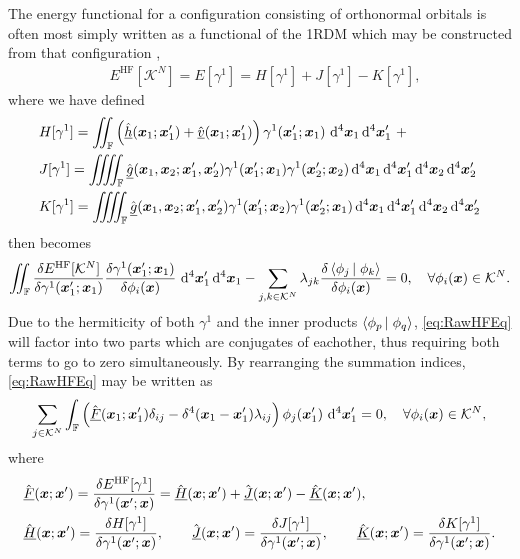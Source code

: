 The energy functional for a configuration consisting of orthonormal orbitals is often most simply 
written as a functional of the 1RDM which may be constructed from that configuration \cite{Yang89_book},
\begin{align}
&E^\mathrm{HF}[\mathcal{K}^N] = E[\gamma^1] = H[\gamma^1] + J[\gamma^1] - K[\gamma^1],
\end{align}
where we have defined
\begin{align}
  &H[\gamma^1] = 
    \iint_\mathbb{F} \left( \spop{h}(\vc{x}_1; \vc{x}_1') + \spop{v}(\vc{x}_1; \vc{x}_1')\right) \gamma^1(\vc{x}'_1; \vc{x}_1) \, \dd^4\vc{x}_1 \dd^4\vc{x}'_1\,\,+ 
    \\
  &J[\gamma^1] = \iiiint_\mathbb{F} \spop{g}(\vc{x}_1, \vc{x}_2; \vc{x}_1', \vc{x}_2') 
      \gamma^1(\vc{x}'_1; \vc{x}_1)\gamma^1(\vc{x}'_2; \vc{x}_2) 
    \dd^4\vc{x}_1 \dd^4\vc{x}'_1\dd^4\vc{x}_2 \dd^4\vc{x}'_2 \\
  &K[\gamma^1] = \iiiint_\mathbb{F} \spop{g}(\vc{x}_1, \vc{x}_2; \vc{x}_1', \vc{x}_2') 
      \gamma^1(\vc{x}'_1; \vc{x}_2)\gamma^1(\vc{x}'_2; \vc{x}_1) 
    \dd^4\vc{x}_1 \dd^4\vc{x}'_1\dd^4\vc{x}_2 \dd^4\vc{x}'_2 
\end{align}
 then becomes
\begin{equation}
    \label{eq:RawHFEq}
    \int\mkern-12mu\int_{\mathbb F}\frac{\delta E^\mathrm{HF}[\mathcal{K}^N]}{\delta \gamma^{1} (\boldsymbol{x}'_1; \boldsymbol{x}_1)} \frac{\delta \gamma^{1}(\boldsymbol{x}'_1; \boldsymbol{x}_1)}{\delta \phi_i(\boldsymbol{x})} \,\,\mathrm{d}^4\boldsymbol{x}'_1 \,\mathrm{d}^4 \boldsymbol{x}_1 - 
    \sum_{j,k \in \mathcal{K}^N} \lambda_{jk} \frac{\delta \left\langle \phi_j \left\vert\right. \phi_k \right\rangle}{\delta \phi_i(\boldsymbol{x})}  = 0 ,\quad \forall \phi_i(\boldsymbol{x}) \in \mathcal{K}^N.
\end{equation}
Due to the hermiticity of both $\gamma^1$ and the inner products $\left\langle \phi_p \left\vert\right. \phi_q \right\rangle$, \cref{eq:RawHFEq} will factor into two parts which are 
conjugates of eachother, thus requiring both terms to go to zero simultaneously. By rearranging the summation indices, \cref{eq:RawHFEq} may be written as
\begin{align}
  \label{eq:HFNonCan}
  \sum_{j \in \mathcal{K}^N}
  \int_{\mathbb F} \left( \hat{\underline{F}}(\boldsymbol{x}_1; \boldsymbol{x}_1')\delta_{ij}   - \delta^4(\boldsymbol{x} _1- \boldsymbol{x}_1')\lambda_{ij} \right)
    \phi_j(\boldsymbol{x}_1')\,\,\mathrm{d}^4\boldsymbol{x}_1' = 0 ,\quad \forall \phi_i(\boldsymbol{x}) \in \mathcal{K}^N,
\end{align}
where
\begin{align}
&\hat{\underline{F}}(\boldsymbol{x}; \boldsymbol{x}') = 
  \frac{\delta E^\mathrm{HF}[\gamma^1]}{\delta \gamma^{1}(\boldsymbol{x}'; \boldsymbol{x})} = \hat{\underline{H}}(\boldsymbol{x};\boldsymbol{x}') + \hat{\underline{J}}(\boldsymbol{x};\boldsymbol{x}') - \hat{\underline{K}}(\boldsymbol{x};\boldsymbol{x}'),\\
&\hat{\underline{H}}(\boldsymbol{x}; \boldsymbol{x}') = \frac{\delta H[\gamma^1]}{\delta \gamma^1(\boldsymbol{x}'; \boldsymbol{x})},\qquad 
\hat{\underline{J}}(\boldsymbol{x}; \boldsymbol{x}') = \frac{\delta J[\gamma^1]}{\delta \gamma^1(\boldsymbol{x}'; \boldsymbol{x})}, \qquad
\hat{\underline{K}}(\boldsymbol{x}; \boldsymbol{x}') = \frac{\delta K[\gamma^1]}{\delta \gamma^1(\boldsymbol{x}'; \boldsymbol{x})} .
\end{align}
